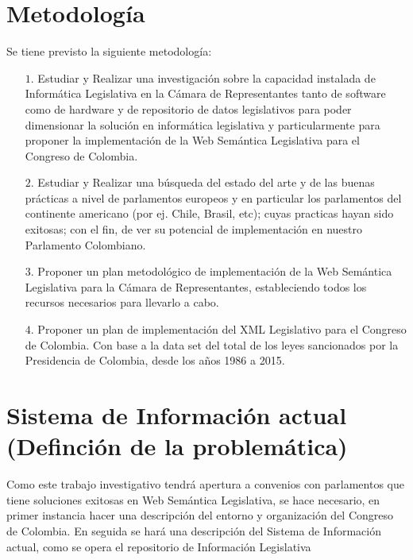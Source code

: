 \documentclass[conference]{IEEEtran}
\begin{document}
\section{Metodología}
Se tiene previsto la siguiente metodología:
\begin{itemize}
   \item[$1.$]	Estudiar y Realizar una investigación sobre la capacidad instalada de Informática Legislativa en la Cámara de Representantes tanto de software como de hardware y de repositorio de datos legislativos para poder dimensionar la solución en informática legislativa y particularmente para proponer  la implementación de la Web Semántica Legislativa para el Congreso de Colombia.\\
   \item[$2.$]	Estudiar y Realizar una búsqueda del estado del arte y de las buenas prácticas a nivel de parlamentos europeos y en particular los parlamentos del continente americano (por ej. Chile, Brasil, etc); cuyas practicas hayan sido exitosas; con el fin, de ver su potencial de implementación en nuestro Parlamento Colombiano. \\
   \item[$3.$]	Proponer un plan metodológico de implementación de la Web Semántica Legislativa para la Cámara de Representantes, estableciendo todos los recursos necesarios para llevarlo a cabo.\\
   \item[$4.$] Proponer un plan de implementación del XML Legislativo para el Congreso de Colombia. Con base a la data set del total de los leyes sancionados por la Presidencia de Colombia, desde los años 1986 a 2015.
\end{itemize}
 
\section{Sistema de Información actual (Definción de la problemática)}
	Como este trabajo investigativo tendrá apertura a convenios con parlamentos que tiene soluciones exitosas en Web Semántica Legislativa, se hace necesario, en primer instancia hacer una descripción del entorno y organización del Congreso de Colombia.
    En seguida se hará una descripción del Sistema de Información actual, como se opera el repositorio de Información Legislativa
	
\end{document}
